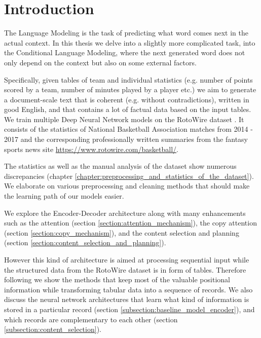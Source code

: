 \chapter*{Introduction} \label{IntroductionChapter}

The Language Modeling is the task of predicting what word comes next in the actual context. In this thesis we delve into a slightly more complicated task, into the Conditional Language Modeling, where the next generated word does not only depend on the context but also on some external factors.

Specifically, given tables of team and individual statistics (e.g. number of points scored by a team,  number of minutes played by a player etc.) we aim to generate a document-scale text that is coherent (e.g. without contradictions), written in good English, and that contains a lot of factual data based on the input tables. We train multiple Deep Neural Network models on the RotoWire dataset \citep{wiseman2017}. It consists of the statistics of National Basketball Association matches from 2014 - 2017 and the corresponding professionally written summaries from the fantasy sports news site \url{https://www.rotowire.com/basketball/}.

The statistics as well as the manual analysis of the dataset show numerous discrepancies (chapter \ref{chapter:preprocessing_and_statistics_of_the_dataset}). We elaborate on various preprocessing and cleaning methods that should make the learning path of our models easier.

We explore the Encoder-Decoder architecture \citep{sutskever2014sequence} along with many enhancements such as the attention (section \ref{section:attention_mechanism}), the copy attention (section \ref{section:copy_mechanism}), and the content selection and planning (section \ref{section:content_selection_and_planning}).

However this kind of architecture is aimed at processing sequential input while the structured data from the RotoWire dataset is in form of tables. Therefore following \citet{wiseman2017} we show the methods that keep most of the valuable positional information while transforming tabular data into a sequence of records. We also discuss the neural network architectures that learn what kind of information is stored in a particular record (section \ref{subsection:baseline_model_encoder}), and which records are complementary to each other (section \ref{subsection:content_selection}).

